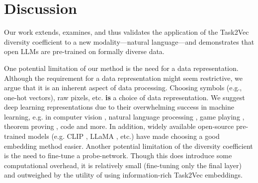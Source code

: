 \section{Discussion}
Our work extends, examines, and thus validates the application of the Task2Vec diversity coefficient to a new modality---natural language---and demonstrates that open LLMs are pre-trained on formally diverse data.

One potential limitation of our method is the need for a data representation. 
Although the requirement for a data representation might seem restrictive, we argue that it is an inherent aspect of data processing.
Choosing symbols (e.g., one-hot vectors), raw pixels, etc. \textbf{is} a choice of data representation.
We suggest deep learning representations due to their overwhelming success in machine learning, e.g. in computer vision \citep{alexnet, resnet}, natural language processing \citep{bert, gpt3, chowdhery2022palm, gpt4, google2023palm2}, game playing \citep{alphago, atari1, EfficientZero}, theorem proving \citep{skiptree, gptf, pact}, code \citep{codex} and more.
In addition, widely available open-source pre-trained models (e.g. CLIP \citep{clip}, LLaMA \citep{llama}, etc.) have made choosing a good embedding method easier. Another potential limitation of the diversity coefficient is the need to fine-tune a probe-network. Though this does introduce some computational overhead, it is relatively small (fine-tuning only the final layer) and outweighed by the utility of using information-rich Task2Vec embeddings. %

